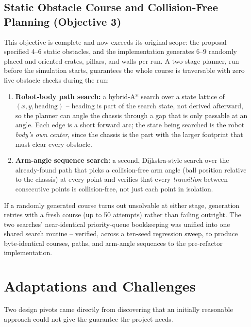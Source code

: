 \documentclass[10pt,twocolumn]{article}
\begin{document}
\subsection{Static Obstacle Course and Collision-Free Planning (Objective 3)}
This objective is complete and now exceeds its original scope: the
proposal specified 4--6 static obstacles, and the implementation generates
6--9 randomly placed and oriented crates, pillars, and walls per run. A
two-stage planner, run before the simulation starts, guarantees the whole
course is traversable with zero live obstacle checks during the run:
\begin{enumerate}[nosep]
  \item \textbf{Robot-body path search:} a hybrid-A* search over a state
  lattice of $(x, y, \text{heading})$ -- heading is part of the search
  state, not derived afterward, so the planner can angle the chassis
  through a gap that is only passable at an angle. Each edge is a short
  forward arc; the state being searched is the robot \emph{body's own
  center}, since the chassis is the part with the larger footprint that
  must clear every obstacle.
  \item \textbf{Arm-angle sequence search:} a second, Dijkstra-style search
  over the already-found path that picks a collision-free arm angle (ball
  position relative to the chassis) at every point and verifies that every
  \emph{transition} between consecutive points is collision-free, not just
  each point in isolation.
\end{enumerate}
If a randomly generated course turns out unsolvable at either stage,
generation retries with a fresh course (up to 50 attempts) rather than
failing outright. The two searches' near-identical priority-queue bookkeeping 
was unified into one shared search routine -- verified, across a ten-seed 
regression sweep, to produce byte-identical courses, paths, and arm-angle 
sequences to the pre-refactor implementation.

\section{Adaptations and Challenges}
Two design pivots came directly from discovering that an initially
reasonable approach could not give the guarantee the project needs.
\end{document}
